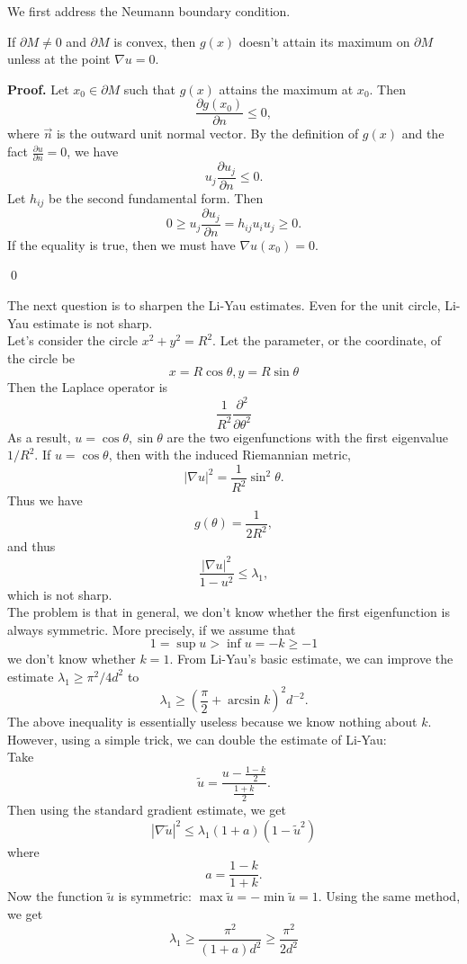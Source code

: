 We first address the Neumann boundary condition.
\begin{lemma}
If $\partial M \neq 0$ and $\partial M$ is convex, then $g(x)$ doesn't attain
its maximum on $\partial M$ unless at the point $\nabla u=0$.
\end{lemma}

{\bf Proof.}
Let $x_0 \in \partial M$ such that $g(x)$ attains the maximum at $x_0$. Then
\[
\frac{\partial g(x_0)}{\partial n} \leqslant 0,
\]
where $\vec{n}$ is the outward unit normal vector. By the definition of $g(x)$
and the fact $\frac{\partial u}{\partial n} = 0$, we have
\[
u_j\frac{\partial u_j}{\partial n} \leqslant 0.
\]
Let $h_{ij}$ be the second fundamental form. Then
\[
0 \geqslant u_j\frac{\partial u_j}{\partial n} = h_{ij} u_i u_j \geqslant 0.
\]
If the equality is true, then we must have $\nabla u(x_0) = 0$. 

\qed


The next question is to sharpen the Li-Yau estimates. Even for the unit circle,
Li-Yau estimate is not sharp.
\\

Let's consider the circle $x^2 + y^2 = R^2$. Let the parameter, or the 
coordinate, of the circle be
\[
x = R\cos \theta, y = R\sin \theta
\]
Then the Laplace operator is
\[
\frac{1}{R^2}\frac{\partial^2}{\partial\theta^2}
\]
As a result, $u = \cos\theta, \sin\theta$ are the two eigenfunctions with the
first eigenvalue $1/R^2$. If $u = \cos\theta$, then with the induced Riemannian
metric,
\[
|\nabla u|^2 = \frac{1}{R^2}\sin^2\theta.
\]
Thus we have
\[
g(\theta) = \frac{1}{2R^2},
\]
and thus
\[
\frac{|\nabla u|^2}{1 - u^2} \leqslant \lambda_1,
\]
which is not sharp.
\\

The problem is that in general, we don't know whether the first eigenfunction is
always symmetric. More precisely, if we assume that
\[
1 = \sup u > \inf u = -k \geqslant -1
\]
we don't know whether $k = 1$. From Li-Yau's basic estimate, we can improve the
estimate $\lambda_1 \geqslant \pi^2/4d^2$ to
\[
\lambda_1 \geqslant (\frac{\pi}{2} + \arcsin k)^2 d^{-2}.
\]
The above inequality is essentially useless because we know nothing about $k$.
However, using a simple trick, we can double the estimate of Li-Yau:
\\

Take
\[
\widetilde u = \frac{u - \frac{1-k}{2}}{\frac{1+k}{2}}.
\]
Then using the standard gradient estimate, we get
\begin{equation}\label{3}
|\nabla \widetilde u|^2 \leqslant \lambda_1(1+a)(1-\widetilde u^2)
\end{equation}
where
\[
a = \frac{1-k}{1+k}.
\]
Now the function $\widetilde u$ is symmetric: 
$\max\widetilde u=-\min\widetilde u = 1$. Using the same method, we get
\[
\lambda_1 \geqslant \frac{\pi^2}{(1+a)d^2} \geqslant \frac{\pi^2}{2d^2}
\]

